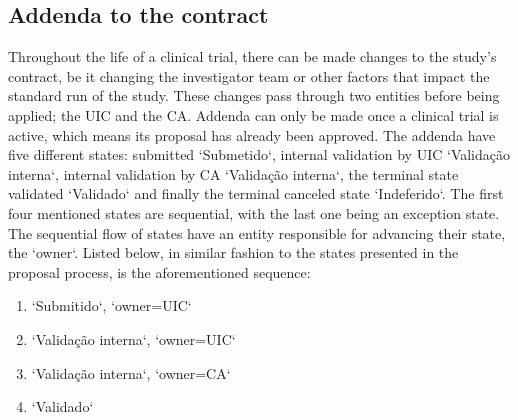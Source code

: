 \subsection{Addenda to the contract}
\label{subsec:addenda-process}
Throughout the life of a clinical trial, there can be made changes to the study's contract, be it changing the investigator team or other factors that impact the standard run of the study. These changes pass through two entities before being applied; the UIC and the CA.  
Addenda can only be made once a clinical trial is active, which means its proposal has already been approved.  
The addenda have five different states: submitted `Submetido`, internal validation by UIC `Validação interna`, internal validation by CA `Validação interna`, the terminal state validated `Validado` and finally the terminal canceled state `Indeferido`.  
The first four mentioned states are sequential, with the last one being an exception state. The sequential flow of states have an entity responsible for advancing their state, the `owner`. Listed below, in similar fashion to the states presented in the proposal process, is the aforementioned sequence:
\begin{enumerate}
    \item `Submitido`, `owner=UIC`
    \item `Validação interna`, `owner=UIC` 
    \item `Validação interna`, `owner=CA`
    \item `Validado`
\end{enumerate}


